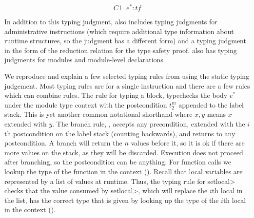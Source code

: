 $$\boxed{C \vdash e^{*} : tf}$$

In addition to this typing judgment, \wasm also includes typing judgments for administrative instructions (which require additional type information about runtime structures, so the judgment has a different form) and a typing judgment in the form of the reduction relation for the \wasm type safety proof.
\wasm also has typing judgments for modules and module-level declarations.

We reproduce and explain a few selected typing rules from \wasm using the static typing judgement.
Most typing rules are for a single instruction and there are a few rules which can combine rules.
The rule for typing a block,  typechecks the body $e^{*}$ under the module type context with the postcondition $t_2^{m}$ appended to the label stack.
This is yet another common notational shorthand where $x,y$ means $x$ extended with $y$.
The branch rule, , accepts any precondition, extended with the $i$th postcondition on the label stack (counting backwards), and returns to any postcondition.
A branch will return the $n$ values before it, so it is ok if there are more values on the stack, as they will be discarded.
Execution does not proceed after branching, so the postcondition can be anything.
For function calls we lookup the type of the function in the context ().
Recall that local variables are represented by a list of values at runtime.
Thus, the typing rule for \<setlocal> checks that the value consumed by \<setlocal>, which will replace the $i$th local in the list, has the correct type that is given by looking up the type of the $i$th local in the context ().

\begin{mathpar}




\end{mathpar}

